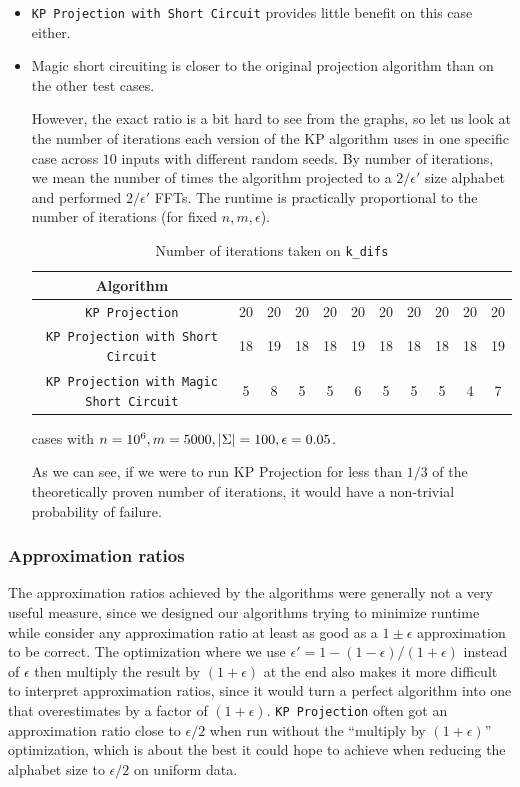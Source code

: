 \documentclass{article}
\theoremstyle{definition}
\newcommand{\eps}{\epsilon}
\DeclarePairedDelimiter{\abs}{\lvert}{\rvert}
\begin{document}
\begin{itemize}
    \item \texttt{KP Projection with Short Circuit} provides little benefit on this case either.
    \item Magic short circuiting is closer to the original projection algorithm than on the other test cases.

    However, the exact ratio is a bit hard to see from the graphs, so let us look at the number of iterations each version of the KP algorithm uses in one specific case across $10$ inputs with different random seeds.
    By number of iterations, we mean the number of times the algorithm projected to a $2/\eps'$ size alphabet and performed $2/\eps'$ FFTs.
    The runtime is practically proportional to the number of iterations (for fixed $n, m, \eps$).

    \begin{table}[H]
        \centering
        \begin{tabular}{|c|c|c|c|c|c|c|c|c|c|c|}
            \hline
            Algorithm & & & & & & & & & & \\
            \hline
            \texttt{KP Projection} & 20 & 20 & 20 & 20 & 20 & 20 & 20 & 20 & 20 & 20 \\
            \texttt{KP Projection with Short Circuit} & 18 & 19 & 18 & 18 & 19 & 18 & 18 & 18 & 18 & 19 \\
            \texttt{KP Projection with Magic Short Circuit} & 5 & 8 & 5 & 5 & 6 & 5 & 5 & 5 & 4 & 7 \\
            \hline
        \end{tabular}
        \caption{Number of iterations taken on \texttt{k\_difs}} cases with $n = 10^6, m = 5000, \abs{\Sigma} = 100, \eps = 0.05$.
        \label{tab:k_dif_ex}
    \end{table}

    As we can see, if we were to run KP Projection for less than $1/3$ of the theoretically proven number of iterations, it would have a non-trivial probability of failure.
\end{itemize}

\subsubsection{Approximation ratios}

The approximation ratios achieved by the algorithms were generally not a very useful measure, since we designed our algorithms trying to minimize runtime while consider any approximation ratio at least as good as a $1 \pm \eps$ approximation to be correct.
The optimization where we use $\eps' = 1 - (1-\eps)/(1+\eps)$ instead of $\eps$ then multiply the result by $(1+\eps)$ at the end also makes it more difficult to interpret approximation ratios, since it would turn a perfect algorithm into one that overestimates by a factor of $(1 + \eps)$.
\texttt{KP Projection} often got an approximation ratio close to $\eps/2$ when run without the ``multiply by $(1 + \eps)$'' optimization, which is about the best it could hope to achieve when reducing the alphabet size to $\eps/2$ on uniform data.
\end{document}
